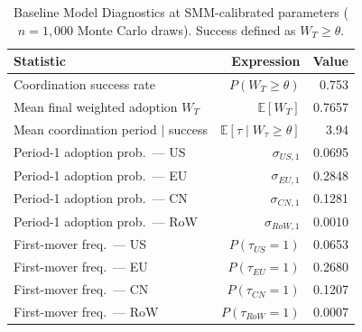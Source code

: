 \begin{table}[htbp]
\centering
\small
\caption{Baseline Model Diagnostics at SMM-calibrated parameters ($n = 1{,}000$ Monte Carlo draws). Success defined as $W_T \geq \theta$.}
\label{tab:baseline_diagnostics}
\begin{tabular}{lrr}
\toprule
\textbf{Statistic} & \textbf{Expression} & \textbf{Value} \\
\midrule
Coordination success rate & $P(W_T \geq \theta)$ & 0.753 \\
Mean final weighted adoption $W_T$ & $\mathbb{E}[W_T]$ & 0.7657 \\
Mean coordination period $\mid$ success & $\mathbb{E}[\tau \mid W_\tau \geq \theta]$ & 3.94 \\
\midrule
Period-1 adoption prob.\ --- US & $\sigma_{US,1}$ & 0.0695 \\
Period-1 adoption prob.\ --- EU & $\sigma_{EU,1}$ & 0.2848 \\
Period-1 adoption prob.\ --- CN & $\sigma_{CN,1}$ & 0.1281 \\
Period-1 adoption prob.\ --- RoW & $\sigma_{RoW,1}$ & 0.0010 \\
\midrule
First-mover freq.\ --- US & $P(\tau_{US}=1)$ & 0.0653 \\
First-mover freq.\ --- EU & $P(\tau_{EU}=1)$ & 0.2680 \\
First-mover freq.\ --- CN & $P(\tau_{CN}=1)$ & 0.1207 \\
First-mover freq.\ --- RoW & $P(\tau_{RoW}=1)$ & 0.0007 \\
\bottomrule
\end{tabular}
\end{table}